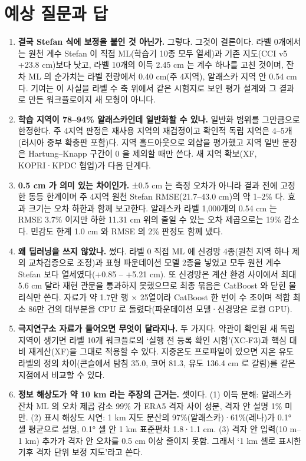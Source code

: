 \section{예상 질문과 답}

\begin{enumerate}[leftmargin=1.8em, itemsep=0.45em, label=\textbf{Q\arabic*.}]
  \item \textbf{결국 Stefan 식에 보정을 붙인 것 아닌가.} 그렇다. 그것이 결론이다. 라벨 0개에서는 원천 계수 Stefan 이 직접 ML(학습기 10종 모두 열세)과 기존 지도(CCI v5 +23.8 cm)보다 낫고, 라벨 10개의 이득 2.45 cm 는 계수 하나를 고친 것이며, 잔차 ML 의 순가치는 라벨 전량에서 0.40 cm(주 4지역), 알래스카 지역 안 0.54 cm 다. 기여는 이 사실을 라벨 수 축 위에서 같은 시험지로 보인 평가 설계와 그 결과로 만든 워크플로이지 새 모형이 아니다.
  \item \textbf{학습 지역이 78–94\% 알래스카인데 일반화할 수 있나.} 일반화 범위를 그만큼으로 한정한다. 주 4지역 판정은 재사용 지역의 재검정이고 확인적 독립 지역은 4–5개(러시아 중부 확충판 포함)다. 지역 홀드아웃으로 외삽을 평가했고 지역 일반 문장은 Hartung–Knapp 구간이 0 을 제외할 때만 쓴다. 새 지역 확보(XF, KOPRI·KPDC 협업)가 다음 단계다.
  \item \textbf{0.5 cm 가 의미 있는 차이인가.} ±0.5 cm 는 측정 오차가 아니라 결과 전에 고정한 동등 한계이며 주 4지역 원천 Stefan RMSE(21.7–43.0 cm)의 약 1–2\% 다. 효과 크기는 오차 하한과 함께 보고한다. 알래스카 라벨 1,000개의 0.54 cm 는 RMSE 3.7\% 이지만 하한 11.31 cm 위의 줄일 수 있는 오차 제곱으로는 19\% 감소다. 민감도 한계 1.0 cm 와 RMSE 의 2\% 판정도 함께 냈다.
  \item \textbf{왜 딥러닝을 쓰지 않았나.} 썼다. 라벨 0 직접 ML 에 신경망 4종(원천 지역 하나 제외 교차검증으로 조정)과 표형 파운데이션 모델 2종을 넣었고 모두 원천 계수 Stefan 보다 열세였다(+0.85 – +5.21 cm). 또 신경망은 계산 환경 사이에서 최대 5.6 cm 달라 재현 관문을 통과하지 못했으므로 최종 묶음은 CatBoost 와 닫힌 물리식만 쓴다. 자료가 약 1.7만 행 × 25열이라 CatBoost 한 번이 수 초이며 적합 최소 86만 건의 대부분을 CPU 로 돌렸다(파운데이션 모델·신경망은 로컬 GPU).
  \item \textbf{극지연구소 자료가 들어오면 무엇이 달라지나.} 두 가지다. 약관이 확인된 새 독립 지역이 생기면 라벨 10개 워크플로의 ‘실행 전 등록 확인 시험’(XC-F3)과 핵심 대비 재계산(XF)을 그대로 적용할 수 있다. 지중온도 프로파일이 있으면 지온 유도 라벨의 정의 차이(콘슬에서 탐침 35.0, 코어 81.3, 유도 136.4 cm 로 갈림)를 같은 지점에서 비교할 수 있다.
  \item \textbf{정보 해상도가 약 10 km 라는 주장의 근거는.} 셋이다. (1) 이득 분해: 알래스카 잔차 ML 의 오차 제곱 감소 99\% 가 ERA5 격자 사이 성분, 격자 안 설명 1\% 미만. (2) 표시 해상도 시연: 1 km 지도 분산의 97\%(알래스카)·61\%(레나)가 0.1° 셀 평균으로 설명, 0.1° 셀 안 1 km 표준편차 1.8·1.1 cm. (3) 격자 안 입력(10 m–1 km) 추가가 격자 안 오차를 0.5 cm 이상 줄이지 못함. 그래서 ‘1 km 셀로 표시한 기후 격자 단위 보정 지도’라고 쓴다.

\end{enumerate}
